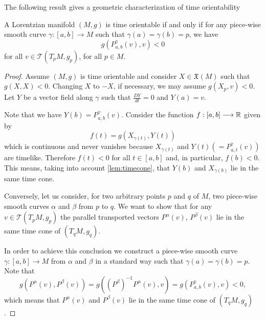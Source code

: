 

The following result gives a geometric characterization of time orientability \cite[p. 255]{S-W} 


\begin{corollary}\label{parallel_transport}

    A Lorentzian manifold $(M,g)$ is time orientable if and only if for any piece-wise smooth curve $\gamma : [a,b] \longrightarrow M$ such that $\gamma(a)=\gamma(b)=p$, we have
    \[
    g(P_{a,b}^{\gamma}(v),v)<0
    \]
    for all $v\in \mathcal{T}(T_pM,g_p)$, for all $p \in M$.

\end{corollary}

\begin{proof}
    Assume $(M,g)$ is time orientable and consider $X \in \mathfrak{X}(M)$ such that $g(X,X)<0$. Changing $X$ to $-X$, if necessary, we may assume $g(X_p,v)<0$. Let $Y$ be a vector field along $\gamma$ such that $\frac{DY}{dt}=0$ and $Y(a)=v$.

    Note that we have $Y(b)=P_{a,b}^{\gamma}(v)$. Consider the function $f : [a,b] \longrightarrow \mathbb{R}$ given by
    \[
        f(t)= g(X_{\gamma(t)},Y(t))
    \]
    which is continuous and never vanishes because $X_{\gamma(t)}$ and $Y(t)(=P_{a,t}^{\gamma}(v))$ are timelike. Therefore $f(t)<0$ for all $t\in [a,b]$ and, in particular, $f(b)<0$. This means, taking into account \autoref{lem:timecone}, that $Y(b)$ and $X_{\gamma(b)}$ lie in the same time cone.

    Conversely, let us consider, for two arbitrary points $p$ and $q$ of $M$, two piece-wise smooth curves $\alpha$ and $\beta$ from $p$ to $q$. We want to show that for any $v\in \mathcal{T}(T_pM,g_p)$ the parallel transported vectors $P^{\alpha}(v)$, $P^{\beta}(v)$ lie in the same time cone of $(T_qM,g_q)$.

    In order to achieve this conclusion we construct a piece-wise smooth curve $\gamma : [a,b] \longrightarrow M$ from $\alpha$ and $\beta$ in a standard way such that $\gamma(a)=\gamma(b)=p$. Note that $$g(P^{\alpha}(v),P^{\beta}(v))=g((P^{\beta})^{-1}P^{\alpha}(v),v)=g(P_{a,b}^{\gamma}(v),v)<0,$$ which means that $P^{\alpha}(v)$ and $P^{\beta}(v)$ lie in the same time cone of $(T_qM,g_q)$.


\end{proof}

